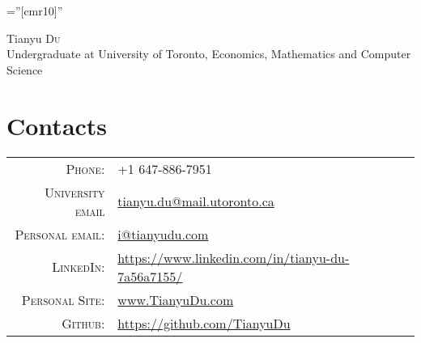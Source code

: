\documentclass[a4paper,10pt]{article}
\begin{document}

\pagestyle{empty} %

\font\fb=''[cmr10]'' %

\par{\centering
		{\Huge Tianyu \textsc{Du} \\
		\small Undergraduate at University of Toronto, Economics, Mathematics and Computer Science
	}\bigskip\par}

\section{Contacts}

\begin{tabular}{rl}
    \textsc{Phone:} & +1 647-886-7951\\
    \textsc{University email} & \href{mailto:tianyu.du@mail.utoronto.ca}{tianyu.du@mail.utoronto.ca} \\
    \textsc{Personal email:} & \href{mailto:i@tianyudu.com}{i@tianyudu.com} \\
    \textsc{LinkedIn:} & \href{https://www.linkedin.com/in/tianyu-du-7a56a7155/}{https://www.linkedin.com/in/tianyu-du-7a56a7155/} \\
    \textsc{Personal Site:} & \href{www.tianyudu.com}{www.TianyuDu.com} \\
    \textsc{Github:} & \href{https://github.com/TianyuDu}{https://github.com/TianyuDu}
\end{tabular}
\end{document}
